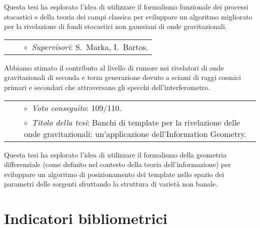 Questa tesi ha esplorato l'idea di utilizzare il formalismo funzionale dei processi stocastici e della teoria dei campi classica per sviluppare un algoritmo migliorato per la rivelazione di fondi stocastici non gaussiani di onde gravitazionali.

\vspace{0.2cm}
\vspace{-0.1cm}
\begin{tabular}{rcl}
&\hspace{0.4cm} &$\circ\;\;${\textit{Supervisori}}: S.~Marka, I.~Bartos.
\end{tabular}
\vspace{0.2cm}

Abbiamo stimato il contributo al livello di rumore nei rivelatori di onde gravitazionali di seconda e terza generazione dovuto a sciami di raggi cosmici primari e secondari che attraversano gli specchi dell'interferometro.

\vspace{0.2cm}
\vspace{-0.1cm}
\begin{tabular}{rcl}
&\hspace{0.4cm} &$\circ\;\;${\textit{Voto conseguito}}: 109/110.\\
&\hspace{0.4cm} &$\circ\;\;${\textit{Titolo della tesi}}: Banchi di template per la rivelazione delle onde gravitazionali: un'applicazione dell'Information Geometry.
\end{tabular}
\vspace{0.2cm}


Questa tesi ha esplorato l'idea di utilizzare il formalismo della geometria differenziale (come definito nel contesto della teoria dell'informazione) per sviluppare un algoritmo di posizionamento dei template nello spazio dei parametri delle sorgenti sfruttando la struttura di varietà non banale.

\section{Indicatori bibliometrici}



